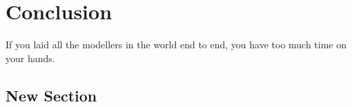 
\chapter[CONCLUSION]{Conclusion} \label{concl}
If you laid all the modellers in the world end to end, you have too
much time on your hands.
\section{New Section}






